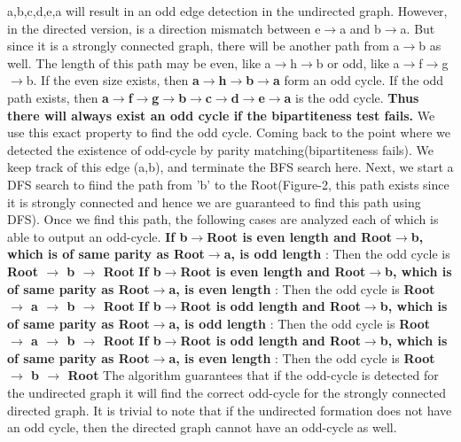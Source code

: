 \documentclass{article}
\begin{document}
  a,b,c,d,e,a will result in an odd edge detection in the undirected graph. However, in the directed version, is a direction mismatch between e$\rightarrow$a and b$\rightarrow$a. But since it is a strongly connected graph, there will be another path from a$\rightarrow$b as well. The length of this path may be even, like a$\rightarrow$h$\rightarrow$b or odd, like a$\rightarrow$f$\rightarrow$g$\rightarrow$b. If the even size exists, then \textbf {a$\rightarrow$h$\rightarrow$b$\rightarrow$a} form an odd cycle. If the odd path exists, then \textbf {a$\rightarrow$f$\rightarrow$g$\rightarrow$b$\rightarrow$c$\rightarrow$d$\rightarrow$e$\rightarrow$a} is the odd cycle. \textbf {Thus there will always exist an odd cycle if the bipartiteness test fails.} We use this exact property to find the odd cycle. \newline
  Coming back to the point where we detected the existence of odd-cycle by parity matching(bipartiteness fails). We keep track of this edge (a,b), and terminate the BFS search here. Next, we start a DFS search to fiind the path from 'b' to the Root(Figure-2, this path exists since it is strongly connected and hence we are guaranteed to find this path using DFS). Once we find this path, the following cases are analyzed each of which is able to output an odd-cycle. \newline
  \hspace*{0.5cm} \textbf{If b$\rightarrow$Root is even length and Root$\rightarrow$b, which is of same parity as Root$\rightarrow$a, is odd length} : Then the odd cycle is \textbf {Root $\rightarrow$ b $\rightarrow$ Root} \newline
  \hspace*{0.5cm} \textbf{If b$\rightarrow$Root is even length and Root$\rightarrow$b, which is of same parity as Root$\rightarrow$a, is even length} : Then the odd cycle is \textbf {Root $\rightarrow$ a $\rightarrow$ b $\rightarrow$ Root} \newline
  \hspace*{0.5cm} \textbf{If b$\rightarrow$Root is odd length and Root$\rightarrow$b, which is of same parity as Root$\rightarrow$a, is odd length} : Then the odd cycle is \textbf {Root $\rightarrow$ a $\rightarrow$ b $\rightarrow$ Root} \newline
  \hspace*{0.5cm} \textbf{If b$\rightarrow$Root is odd length and Root$\rightarrow$b, which is of same parity as Root$\rightarrow$a, is even length} : Then the odd cycle is \textbf {Root $\rightarrow$ b $\rightarrow$ Root} \newline
The algorithm guarantees that if the odd-cycle is detected for the undirected graph it will find the correct odd-cycle for the strongly connected directed graph. It is trivial to note that if the undirected formation does not have an odd cycle, then the directed graph cannot have an odd-cycle as well.  \newline
\end{document}
